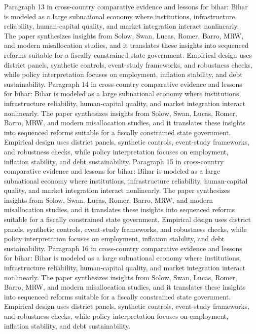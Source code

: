 \documentclass[preprint,12pt]{elsarticle}
\begin{document}
Paragraph 13 in cross-country comparative evidence and lessons for bihar: Bihar is modeled as a large subnational economy where institutions, infrastructure reliability, human-capital quality, and market integration interact nonlinearly. The paper synthesizes insights from Solow, Swan, Lucas, Romer, Barro, MRW, and modern misallocation studies, and it translates these insights into sequenced reforms suitable for a fiscally constrained state government. Empirical design uses district panels, synthetic controls, event-study frameworks, and robustness checks, while policy interpretation focuses on employment, inflation stability, and debt sustainability.
Paragraph 14 in cross-country comparative evidence and lessons for bihar: Bihar is modeled as a large subnational economy where institutions, infrastructure reliability, human-capital quality, and market integration interact nonlinearly. The paper synthesizes insights from Solow, Swan, Lucas, Romer, Barro, MRW, and modern misallocation studies, and it translates these insights into sequenced reforms suitable for a fiscally constrained state government. Empirical design uses district panels, synthetic controls, event-study frameworks, and robustness checks, while policy interpretation focuses on employment, inflation stability, and debt sustainability.
Paragraph 15 in cross-country comparative evidence and lessons for bihar: Bihar is modeled as a large subnational economy where institutions, infrastructure reliability, human-capital quality, and market integration interact nonlinearly. The paper synthesizes insights from Solow, Swan, Lucas, Romer, Barro, MRW, and modern misallocation studies, and it translates these insights into sequenced reforms suitable for a fiscally constrained state government. Empirical design uses district panels, synthetic controls, event-study frameworks, and robustness checks, while policy interpretation focuses on employment, inflation stability, and debt sustainability.
Paragraph 16 in cross-country comparative evidence and lessons for bihar: Bihar is modeled as a large subnational economy where institutions, infrastructure reliability, human-capital quality, and market integration interact nonlinearly. The paper synthesizes insights from Solow, Swan, Lucas, Romer, Barro, MRW, and modern misallocation studies, and it translates these insights into sequenced reforms suitable for a fiscally constrained state government. Empirical design uses district panels, synthetic controls, event-study frameworks, and robustness checks, while policy interpretation focuses on employment, inflation stability, and debt sustainability.
\end{document}
